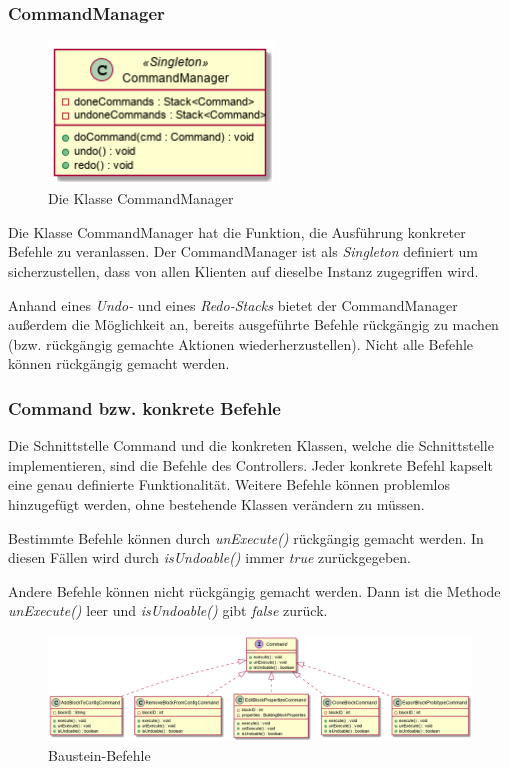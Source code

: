 \documentclass[parskip=full]{scrartcl}
\begin{document}
\subsubsection{CommandManager}

\begin{figure}[htbp]
	\begin{center}
		\includegraphics[width = 6cm]{Grafiken/CommandManager.png}
		\caption{Die Klasse CommandManager}
		\label{CommandManager}
	\end{center}
\end{figure}

Die Klasse CommandManager hat die Funktion, die Ausführung konkreter Befehle zu veranlassen. Der CommandManager ist als \textit{Singleton} definiert um sicherzustellen, dass von allen Klienten auf dieselbe Instanz zugegriffen wird.

Anhand eines \textit{Undo-} und eines \textit{Redo-Stacks} bietet der CommandManager außerdem die Möglichkeit an, bereits ausgeführte Befehle rückgängig zu machen (bzw. rückgängig gemachte Aktionen wiederherzustellen). Nicht alle Befehle können rückgängig gemacht werden.

\subsubsection{Command bzw. konkrete Befehle}

Die Schnittstelle Command und die konkreten Klassen, welche die Schnittstelle implementieren, sind die Befehle des Controllers. Jeder konkrete Befehl kapselt eine genau definierte Funktionalität. Weitere Befehle können problemlos hinzugefügt werden, ohne bestehende Klassen verändern zu müssen.

Bestimmte Befehle können durch \textit{unExecute()} rückgängig gemacht werden. In diesen Fällen wird durch \textit{isUndoable()} immer \textit{true} zurückgegeben.

Andere Befehle können nicht rückgängig gemacht werden. Dann ist die Methode \textit{unExecute()} leer und \textit{isUndoable()} gibt \textit{false} zurück.

\begin{figure}[htbp]
	\begin{center}
		\includegraphics[width = 14cm]{Grafiken/Commands1.png}
		\caption{Baustein-Befehle}
		\label{Commands1}
	\end{center}
\end{figure}
\end{document}

